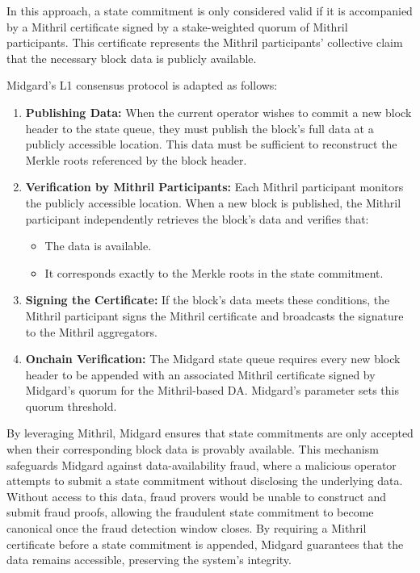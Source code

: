 \documentclass[../midgard.tex]{subfiles}
\begin{document}
In this approach, a state commitment is only considered valid if it is accompanied by a Mithril certificate signed by a stake-weighted quorum of Mithril participants.
This certificate represents the Mithril participants' collective claim that the necessary block data is publicly available.

Midgard's L1 consensus protocol is adapted as follows:
\begin{enumerate}
  \item \textbf{Publishing Data:} When the current operator wishes to commit a new block header to the state queue, they must publish the block's full data at a publicly accessible location.
    This data must be sufficient to reconstruct the Merkle roots referenced by the block header.
  \item \textbf{Verification by Mithril Participants:} Each Mithril participant monitors the publicly accessible location.
    When a new block is published, the Mithril participant independently retrieves the block's data and verifies that:
  \begin{itemize}
    \item The data is available.
    \item It corresponds exactly to the Merkle roots in the state commitment.
  \end{itemize}
  \item \textbf{Signing the Certificate:} If the block's data meets these conditions, the Mithril participant signs the Mithril certificate and broadcasts the signature to the Mithril aggregators.
  \item \textbf{Onchain Verification:} The Midgard state queue requires every new block header to be appended with an associated Mithril certificate signed by Midgard's quorum for the Mithril-based DA.
    Midgard's  parameter sets this quorum threshold.
\end{enumerate}

By leveraging Mithril, Midgard ensures that state commitments are only accepted when their corresponding block data is provably available.
This mechanism safeguards Midgard against data-availability fraud, where a malicious operator attempts to submit a state commitment without disclosing the underlying data.
Without access to this data, fraud provers would be unable to construct and submit fraud proofs, allowing the fraudulent state commitment to become canonical once the fraud detection window closes.
By requiring a Mithril certificate before a state commitment is appended, Midgard guarantees that the data remains accessible, preserving the system's integrity.
\end{document}
